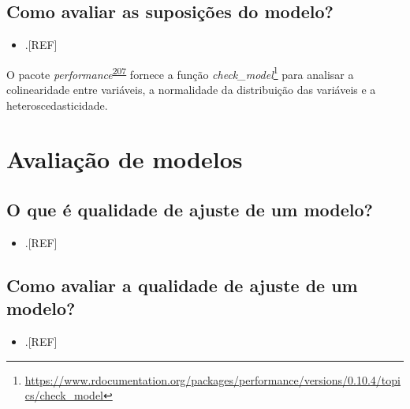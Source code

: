 \documentclass[
  a4paper,
]{book}
\providecommand{\tightlist}{%
  \setlength{\itemsep}{0pt}\setlength{\parskip}{0pt}}
\renewcommand{\href}[2]{#2\footnote{\url{#1}}}
\newenvironment{infobox}[1]
  {
  \begin{itemize}
  \renewcommand{\labelitemi}{
    \raisebox{-.7\height}[0pt][0pt]{
      {\setkeys{Gin}{width=3em,keepaspectratio}
        \texttt{[image: \#1]}}
    }
  }
  \setlength{\fboxsep}{1em}
  \begin{blackbox}
  \item
  }
  {
  \end{blackbox}
  \end{itemize}
  }
\begin{document}
\hypertarget{como-avaliar-as-suposiuxe7uxf5es-do-modelo}{%
\subsection{Como avaliar as suposições do modelo?}\label{como-avaliar-as-suposiuxe7uxf5es-do-modelo}}

\begin{itemize}
\tightlist
\item
  .{[}REF{]}
\end{itemize}

\begin{infobox}{images/Rlogo}
O pacote \emph{performance}\textsuperscript{\protect\hyperlink{ref-performance}{207}} fornece a função \href{https://www.rdocumentation.org/packages/performance/versions/0.10.4/topics/check_model}{\emph{check\_model}} para analisar a colinearidade entre variáveis, a normalidade da distribuição das variáveis e a heteroscedasticidade.

\end{infobox}

\hypertarget{avaliacao-modelo}{%
\section{Avaliação de modelos}\label{avaliacao-modelo}}

\hypertarget{o-que-uxe9-qualidade-de-ajuste-de-um-modelo}{%
\subsection{O que é qualidade de ajuste de um modelo?}\label{o-que-uxe9-qualidade-de-ajuste-de-um-modelo}}

\begin{itemize}
\tightlist
\item
  .{[}REF{]}
\end{itemize}

\hypertarget{como-avaliar-a-qualidade-de-ajuste-de-um-modelo}{%
\subsection{Como avaliar a qualidade de ajuste de um modelo?}\label{como-avaliar-a-qualidade-de-ajuste-de-um-modelo}}

\begin{itemize}
\tightlist
\item
  .{[}REF{]}
\end{itemize}
\end{document}
